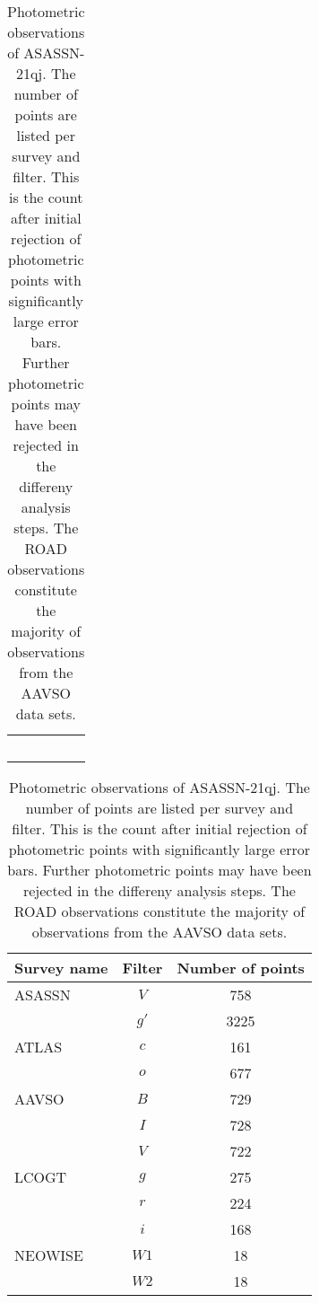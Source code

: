 \documentclass[sn-nature]{sn-jnl}%
\begin{document}
\begin{table}
    \centering
    \caption{Photometric observations of ASASSN-21qj. The number of points are listed per survey and filter. %
    This is the count after initial rejection of photometric points with significantly large error bars.
    Further photometric points may have been rejected in the differeny analysis steps.
    The ROAD observations constitute the majority of observations from the AAVSO data sets.}
    \begin{tabular}{p{}}
    \, \\
    \end{tabular}
   \begin{tabular}{@{}lcc@{}}
   \hline\hline
Survey name  & Filter & Number of points                    \\
       \hline
ASASSN   &  $V$   & 758 \\
  &  $g'$   & 3225 \\
       \hline
ATLAS & $c$ & 161 \\
& $o$ & 677 \\
       \hline
AAVSO   &  $B$   & 729 \\    %
  &  $I$   & 728 \\    %
  &  $V$   & 722 \\    %
       \hline
LCOGT   &  $g$   & 275 \\    %
  &  $r$   & 224 \\    %
  &  $i$   & 168 \\    %
       \hline
NEOWISE & $W1$ & 18 \\
& $W2$ & 18 \\
       \hline
   \end{tabular}

\label{tab:photometry}
\end{table}
\end{document}
